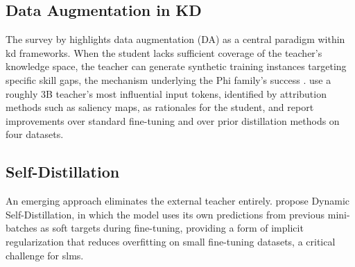 \subsection{Data Augmentation in KD}

The survey by \citet{xu2024kd_survey} highlights data augmentation (DA) as a central paradigm within \gls{kd} frameworks. When the student lacks sufficient coverage of the teacher's knowledge space, the teacher can generate synthetic training instances targeting specific skill gaps, the mechanism underlying the Phi family's success \citep{gunasekar2023phi1}. \citet{ballout2024efficient_kd} use a roughly 3B teacher's most influential input tokens, identified by attribution methods such as saliency maps, as rationales for the student, and report improvements over standard fine-tuning and over prior distillation methods on four datasets.

\subsection{Self-Distillation}

An emerging approach eliminates the external teacher entirely. \citet{fu2024dynamic_selfd} propose Dynamic Self-Distillation, in which the model uses its own predictions from previous mini-batches as soft targets during fine-tuning, providing a form of implicit regularization that reduces overfitting on small fine-tuning datasets, a critical challenge for \glspl{slm}.

